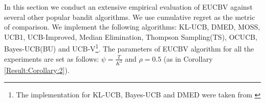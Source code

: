In this section we conduct an extensive empirical evaluation of EUCBV against several other popular bandit algorithms.  We use cumulative regret as the metric of comparison. We implement the following algorithms:  KL-UCB\cite{garivier2011kl}, DMED\cite{honda2010asymptotically}, MOSS\cite{audibert2009minimax}, UCB1\cite{auer2002finite}, UCB-Improved\cite{auer2010ucb}, Median Elimination\cite{even2006action}, Thompson Sampling(TS)\cite{agrawal2011analysis}, OCUCB\cite{lattimore2015optimally}, Bayes-UCB(BU)\cite{kaufmann2012bayesian} and UCB-V\cite{audibert2009exploration}\footnote{The implementation for KL-UCB, Bayes-UCB and DMED were taken from \cite{CapGarKau12}}. The parameters of EUCBV algorithm for all the experiments are set as follows: $\psi=\frac{T}{K^2}$ and $\rho =0.5$ (as in Corollary \ref{Result:Corollary:2}).

